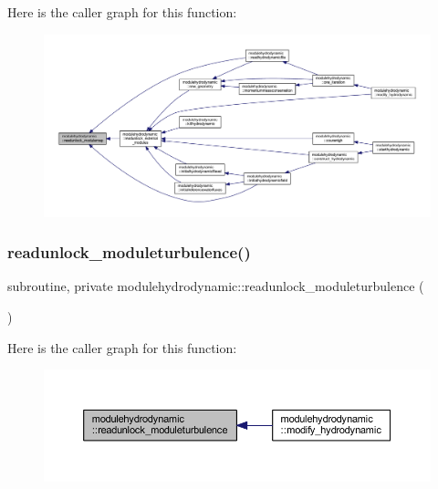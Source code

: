 Here is the caller graph for this function\+:\nopagebreak
\begin{figure}[H]
\begin{center}
\leavevmode
\includegraphics[width=350pt]{namespacemodulehydrodynamic_a5265f8f84b5dfafbb654e42da68f00af_icgraph}
\end{center}
\end{figure}
\mbox{\label{namespacemodulehydrodynamic_a894329be6f1d95af1f87b82950558271}} 
\subsubsection{\texorpdfstring{readunlock\+\_\+moduleturbulence()}{readunlock\_moduleturbulence()}}
{\footnotesize\ttfamily subroutine, private modulehydrodynamic\+::readunlock\+\_\+moduleturbulence (\begin{DoxyParamCaption}{ }\end{DoxyParamCaption})\hspace{0.3cm}{\ttfamily [private]}}

Here is the caller graph for this function\+:\nopagebreak
\begin{figure}[H]
\begin{center}
\leavevmode
\includegraphics[width=350pt]{namespacemodulehydrodynamic_a894329be6f1d95af1f87b82950558271_icgraph}
\end{center}
\end{figure}
\mbox{\label{namespacemodulehydrodynamic_a652c0bf5742de7f1bc1ccdd771297bbc}} 
